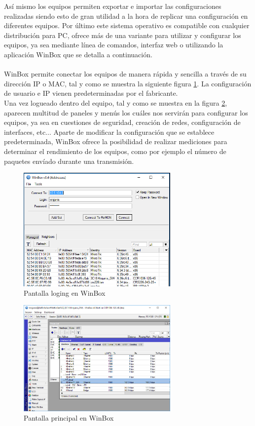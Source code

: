 	Así mismo los equipos permiten exportar e importar las configuraciones realizadas siendo esto de gran utilidad a la hora de replicar una configuración en diferentes equipos. Por último este sistema operativo es compatible con cualquier distribución para PC, ofrece más de una variante para utilizar y configurar los equipos, ya sea mediante línea de comandos, interfaz web o utilizando la aplicación WinBox que se detalla a continuación.\\\\
	
	WinBox permite conectar los equipos de manera rápida y sencilla a través de su dirección IP o MAC, tal y como se muestra la siguiente figura \ref{inicioWinBox}. La configuración de usuario e IP vienen predeterminadas por el fabricante.\\
	Una vez logueado dentro del equipo, tal y como se muestra en la figura \ref{mainWinBox}, aparecen multitud de paneles y menús los cuáles nos servirán para configurar los equipos, ya sea en cuestiones de seguridad, creación de redes, configuración de interfaces, etc... Aparte de modificar la configuración que se establece predeterminada, WinBox ofrece la posibilidad de realizar mediciones para determinar el rendimiento de los equipos, como por ejemplo el número de paquetes envíado durante una transmisión.
		\begin{figure}[H]
			\centering
			\includegraphics[width=0.7\textwidth]{img/winbox_loader.png}
			\caption{Pantalla loging en WinBox}
			\label{inicioWinBox}
		\end{figure}
		\begin{figure}[H]
			\centering
			\includegraphics[width=0.7\textwidth]{img/winbox.png}
			\caption{Pantalla principal en WinBox}
			\label{mainWinBox}
		\end{figure}
